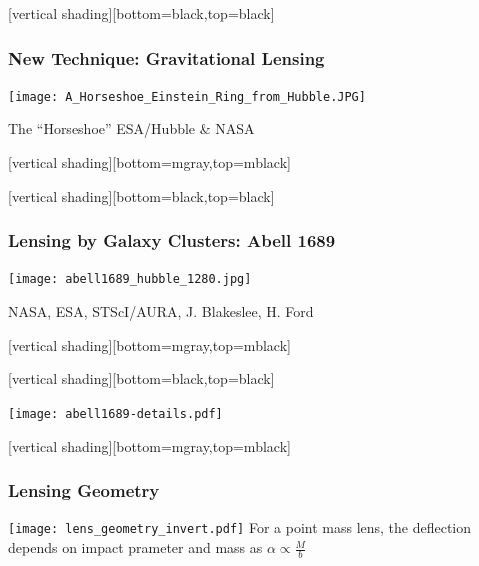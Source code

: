 \documentclass{beamer}
\begin{document}
{
    [vertical shading][bottom=black,top=black]
	
    \frame
    {
        \frametitle{New Technique: Gravitational Lensing}

        \begin{center}
            \texttt{[image: A\_Horseshoe\_Einstein\_Ring\_from\_Hubble.JPG]}

            {\tiny \hfill The ``Horseshoe'' ESA/Hubble \& NASA}
        \end{center}
    }

    [vertical shading][bottom=mgray,top=mblack]

}

{
    [vertical shading][bottom=black,top=black]

    \frame
    {
        \frametitle{Lensing by Galaxy Clusters: Abell 1689}

        \begin{center}
            \texttt{[image: abell1689\_hubble\_1280.jpg]}

            {\tiny \hfill NASA, ESA, STScI/AURA, J. Blakeslee, H. Ford}
        \end{center}
    }

    [vertical shading][bottom=mgray,top=mblack]

}

{
    [vertical shading][bottom=black,top=black]

    \frame
    {
        \begin{center}
            \texttt{[image: abell1689-details.pdf]}
        \end{center}
    }

    [vertical shading][bottom=mgray,top=mblack]

}


\frame
{
    \frametitle{Lensing Geometry}

    \begin{center}
        \texttt{[image: lens\_geometry\_invert.pdf]}
        \newline
        For a point mass lens, the deflection depends on impact
        prameter and mass as
        \newline
        {\huge {\color{gold} $\alpha \propto \frac{M}{b}$ }}
    \end{center}
}
\end{document}
